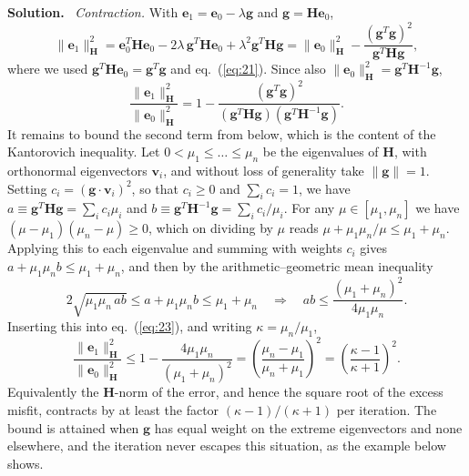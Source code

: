 \documentclass[a4paper,12pt]{paper}
\newcounter{example}
\newenvironment{solution}{\par\noindent\textbf{Solution.}\ }{\par\medskip}
\begin{document}
\begin{solution}
\emph{Contraction.} With $\mathbf{e}_{1}=\mathbf{e}_{0}-\lambda\mathbf{g}$ and $\mathbf{g}=\mathbf{H}\mathbf{e}_{0}$,
\begin{equation}
\|\mathbf{e}_{1}\|_{\mathbf{H}}^{2}=\mathbf{e}_{0}^{T}\mathbf{H}\mathbf{e}_{0}-2\lambda\,\mathbf{g}^{T}\mathbf{H}\mathbf{e}_{0}+\lambda^{2}\mathbf{g}^{T}\mathbf{H}\mathbf{g}
=\|\mathbf{e}_{0}\|_{\mathbf{H}}^{2}-\frac{(\mathbf{g}^{T}\mathbf{g})^{2}}{\mathbf{g}^{T}\mathbf{H}\mathbf{g}},
\label{eq:22}
\end{equation}
where we used $\mathbf{g}^{T}\mathbf{H}\mathbf{e}_{0}=\mathbf{g}^{T}\mathbf{g}$ and eq.~(\ref{eq:21}). Since also
$\|\mathbf{e}_{0}\|_{\mathbf{H}}^{2}=\mathbf{g}^{T}\mathbf{H}^{-1}\mathbf{g}$,
\begin{equation}
\frac{\|\mathbf{e}_{1}\|_{\mathbf{H}}^{2}}{\|\mathbf{e}_{0}\|_{\mathbf{H}}^{2}}
=1-\frac{(\mathbf{g}^{T}\mathbf{g})^{2}}{(\mathbf{g}^{T}\mathbf{H}\mathbf{g})(\mathbf{g}^{T}\mathbf{H}^{-1}\mathbf{g})}.
\label{eq:23}
\end{equation}
It remains to bound the second term from below, which is the content of the Kantorovich inequality. Let
$0<\mu_{1}\le\dots\le\mu_{n}$ be the eigenvalues of $\mathbf{H}$, with orthonormal eigenvectors $\mathbf{v}_{i}$, and without
loss of generality take $\|\mathbf{g}\|=1$. Setting $c_{i}=(\mathbf{g}\cdot\mathbf{v}_{i})^{2}$, so that $c_{i}\ge0$ and
$\sum_{i}c_{i}=1$, we have $a\equiv\mathbf{g}^{T}\mathbf{H}\mathbf{g}=\sum_{i}c_{i}\mu_{i}$ and
$b\equiv\mathbf{g}^{T}\mathbf{H}^{-1}\mathbf{g}=\sum_{i}c_{i}/\mu_{i}$. For any $\mu\in[\mu_{1},\mu_{n}]$ we have
$(\mu-\mu_{1})(\mu_{n}-\mu)\ge0$, which on dividing by $\mu$ reads $\mu+\mu_{1}\mu_{n}/\mu\le\mu_{1}+\mu_{n}$. Applying this
to each eigenvalue and summing with weights $c_{i}$ gives $a+\mu_{1}\mu_{n}b\le\mu_{1}+\mu_{n}$, and then by the
arithmetic--geometric mean inequality
\begin{equation}
2\sqrt{\mu_{1}\mu_{n}\,ab}\le a+\mu_{1}\mu_{n}b\le\mu_{1}+\mu_{n}
\quad\Longrightarrow\quad
ab\le\frac{(\mu_{1}+\mu_{n})^{2}}{4\mu_{1}\mu_{n}}.
\label{eq:24}
\end{equation}
Inserting this into eq.~(\ref{eq:23}), and writing $\kappa=\mu_{n}/\mu_{1}$,
\begin{equation}
\frac{\|\mathbf{e}_{1}\|_{\mathbf{H}}^{2}}{\|\mathbf{e}_{0}\|_{\mathbf{H}}^{2}}\le1-\frac{4\mu_{1}\mu_{n}}{(\mu_{1}+\mu_{n})^{2}}
=\left(\frac{\mu_{n}-\mu_{1}}{\mu_{n}+\mu_{1}}\right)^{2}=\left(\frac{\kappa-1}{\kappa+1}\right)^{2}.
\label{eq:25}
\end{equation}
Equivalently the $\mathbf{H}$-norm of the error, and hence the square root of the excess misfit, contracts by at least the
factor $(\kappa-1)/(\kappa+1)$ per iteration. The bound is attained when $\mathbf{g}$ has equal weight on the extreme
eigenvectors and none elsewhere, and the iteration never escapes this situation, as the example below shows.


\end{solution}
\end{document}
